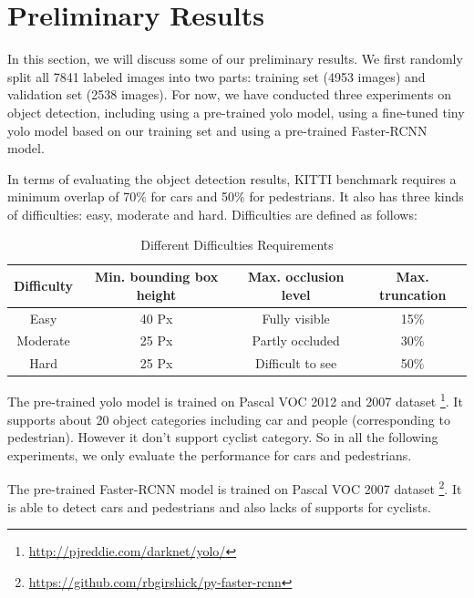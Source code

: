 \section{Preliminary Results}

In this section, we will discuss some of our preliminary results. 
We first randomly split all 7841 labeled images into two parts: 
training set (4953 images) and validation set (2538 images). 
For now, we have conducted three experiments on object detection, including using a pre-trained yolo model, using a fine-tuned tiny yolo model based on our training set and using a pre-trained Faster-RCNN model.

In terms of evaluating the object detection results, KITTI benchmark requires a minimum overlap of 70\% for cars and 50\% for pedestrians. It also has three kinds of difficulties: easy, moderate and hard. Difficulties are defined as follows:

\begin{table}[h!]
\centering
\begin{tabular}{ c | c | c | c }
\hline
Difficulty & Min. bounding box height & Max. occlusion level & Max. truncation \\
\hline \hline
Easy & 40 Px & Fully visible & 15\% \\
Moderate & 25 Px & Partly occluded & 30\% \\
Hard & 25 Px & Difficult to see & 50\% \\
\hline
\end{tabular}
\caption{Different Difficulties Requirements}
\end{table}

The pre-trained yolo model is trained on Pascal VOC 2012 and 2007 dataset \footnote{\url{http://pjreddie.com/darknet/yolo/}}. It supports about 20 object categories including car and people (corresponding to pedestrian). However it don't support cyclist category. So in all the following experiments, we only evaluate the performance for cars and pedestrians.


The pre-trained Faster-RCNN model is trained on Pascal VOC 2007 dataset \footnote{\url{https://github.com/rbgirshick/py-faster-rcnn}}. It is able to detect cars and pedestrians and also lacks of supports for cyclists.

